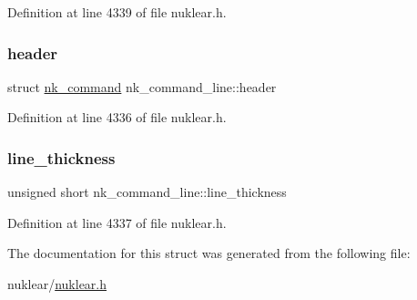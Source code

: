 Definition at line 4339 of file nuklear.\+h.

\mbox{\label{structnk__command__line_a9ca513e60a7dabaaa4048ffecf0b86c9}} 
\subsubsection{\texorpdfstring{header}{header}}
{\footnotesize\ttfamily struct \mbox{\hyperlink{structnk__command}{nk\+\_\+command}} nk\+\_\+command\+\_\+line\+::header}



Definition at line 4336 of file nuklear.\+h.

\mbox{\label{structnk__command__line_a4cf2513ba2e852022553f1d7fff74d05}} 
\subsubsection{\texorpdfstring{line\+\_\+thickness}{line\_thickness}}
{\footnotesize\ttfamily unsigned short nk\+\_\+command\+\_\+line\+::line\+\_\+thickness}



Definition at line 4337 of file nuklear.\+h.



The documentation for this struct was generated from the following file\+:\begin{DoxyCompactItemize}
\item 
nuklear/\mbox{\hyperlink{nuklear_8h}{nuklear.\+h}}\end{DoxyCompactItemize}
